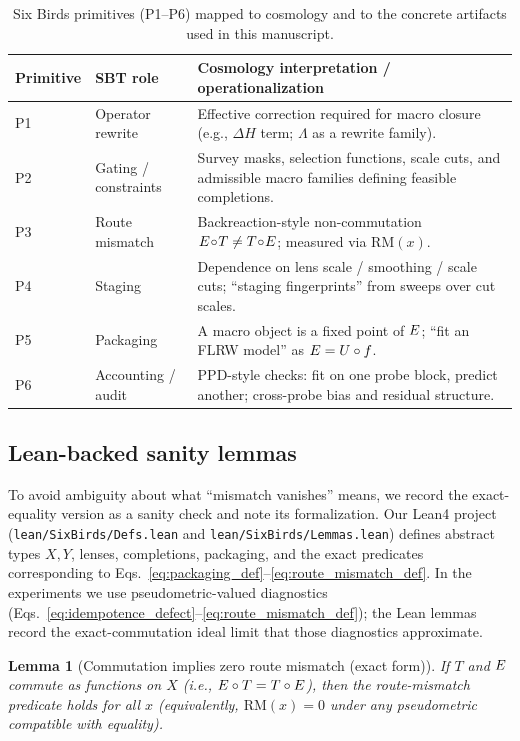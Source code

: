 \documentclass[11pt]{article}
\newcommand{\StateSpace}{X}
\newcommand{\ObsSpace}{Y}
\newcommand{\RM}{\mathrm{RM}}      \newcommand{\iddef}{\delta}
\theoremstyle{definition}
\theoremstyle{plain}
\newtheorem{lemma}[definition]{Lemma}
\theoremstyle{remark}
\begin{document}
\begin{table}[t]
\centering
\caption{Six Birds primitives (P1--P6) mapped to cosmology and to the concrete artifacts used in this manuscript.}
\label{tab:p1p6_map}
\small
\begin{tabular}{@{}l l p{}@{}}
\toprule
Primitive & SBT role & Cosmology interpretation / operationalization \\
\midrule
P1 & Operator rewrite &
Effective correction required for macro closure (e.g., $\Delta H$ term; $\Lambda$ as a rewrite family). \\
P2 & Gating / constraints &
Survey masks, selection functions, scale cuts, and admissible macro families defining feasible completions. \\
P3 & Route mismatch &
Backreaction-style non-commutation $E\!\circ\!T\neq T\!\circ\!E$; measured via $\RM(x)$. \\
P4 & Staging &
Dependence on lens scale / smoothing / scale cuts; ``staging fingerprints'' from sweeps over cut scales. \\
P5 & Packaging &
A macro object is a fixed point of $E$; ``fit an FLRW model'' as $E=U\circ f$. \\
P6 & Accounting / audit &
PPD-style checks: fit on one probe block, predict another; cross-probe bias and residual structure. \\
\bottomrule
\end{tabular}
\end{table}

\subsection{Lean-backed sanity lemmas}\label{sec:framework:lean}
To avoid ambiguity about what ``mismatch vanishes'' means, we record the exact-equality version as a sanity check and note its formalization.
Our Lean4 project (\texttt{lean/SixBirds/Defs.lean} and \texttt{lean/SixBirds/Lemmas.lean}) defines abstract types $\StateSpace,\ObsSpace$, lenses, completions, packaging, and the exact predicates corresponding to Eqs.~\eqref{eq:packaging_def}--\eqref{eq:route_mismatch_def}.
In the experiments we use pseudometric-valued diagnostics (Eqs.~\eqref{eq:idempotence_defect}--\eqref{eq:route_mismatch_def}); the Lean lemmas record the exact-commutation ideal limit that those diagnostics approximate.

\begin{lemma}[Commutation implies zero route mismatch (exact form)]
If $T$ and $E$ commute as functions on $\StateSpace$ (i.e., $E\circ T = T\circ E$), then the route-mismatch predicate holds for all $x$ (equivalently, $\RM(x)=0$ under any pseudometric compatible with equality).
\end{lemma}
\end{document}
